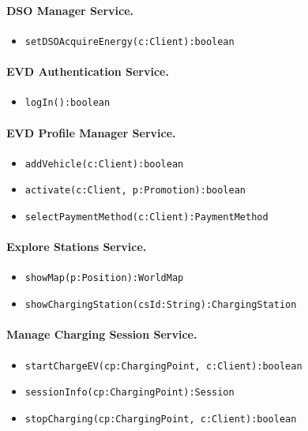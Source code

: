 \paragraph{DSO Manager Service.}
\begin{itemize}
    \item \verb|setDSOAcquireEnergy(c:Client):boolean|
\end{itemize}

\paragraph{EVD Authentication Service.}
\begin{itemize}
    \item \verb|logIn():boolean|
\end{itemize}

\paragraph{EVD Profile Manager Service.}
\begin{itemize}
    \item \verb|addVehicle(c:Client):boolean|
    \item \verb|activate(c:Client, p:Promotion):boolean|
    \item \verb|selectPaymentMethod(c:Client):PaymentMethod|
\end{itemize}

\paragraph{Explore Stations Service.}
\begin{itemize}
    \item \verb|showMap(p:Position):WorldMap|
    \item \verb|showChargingStation(csId:String):ChargingStation|
\end{itemize}

\paragraph{Manage Charging Session Service.}
\begin{itemize}
    \item \verb|startChargeEV(cp:ChargingPoint, c:Client):boolean|
    \item \verb|sessionInfo(cp:ChargingPoint):Session|
    \item \verb|stopCharging(cp:ChargingPoint, c:Client):boolean|
\end{itemize}

